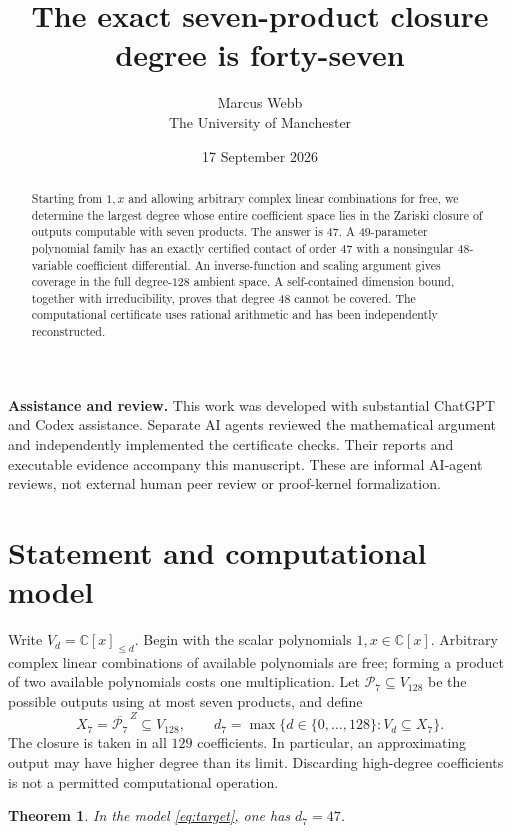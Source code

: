 \documentclass[11pt]{article}
\title{The exact seven-product closure degree is forty-seven}
\author{Marcus Webb\\\small The University of Manchester}
\date{17 September 2026}
\newtheorem{theorem}{Theorem}
\newcommand{\C}{\mathbb C}
\newcommand{\V}[1]{\C[x]_{\le #1}}
\begin{document}
\maketitle

\begin{abstract}
Starting from $1,x$ and allowing arbitrary complex linear combinations
for free, we determine the largest degree whose entire coefficient space
lies in the Zariski closure of outputs computable with seven products.
The answer is $47$. A $49$-parameter polynomial family has an exactly
certified contact of order $47$ with a nonsingular $48$-variable
coefficient differential. An inverse-function and scaling argument gives
coverage in the full degree-$128$ ambient space. A self-contained
dimension bound, together with irreducibility, proves that degree $48$
cannot be covered. The computational certificate uses rational arithmetic
and has been independently reconstructed.
\end{abstract}

\noindent\textbf{Assistance and review.}
This work was developed with substantial ChatGPT and Codex assistance.
Separate AI agents reviewed the mathematical argument and independently
implemented the certificate checks. Their reports and executable evidence
accompany this manuscript. These are informal AI-agent reviews, not
external human peer review or proof-kernel formalization.

\section{Statement and computational model}\label{sec:model}

Write $V_d=\V d$. Begin with the scalar polynomials $1,x\in\C[x]$.
Arbitrary complex linear combinations of available polynomials are free;
forming a product of two available polynomials costs one multiplication.
Let $\mathcal P_7\subseteq V_{128}$ be the possible outputs using at most
seven products, and define
\begin{equation}\label{eq:target}
 X_7=\overline{\mathcal P_7}^{\,Z}\subseteq V_{128},
 \qquad
 d_7=\max\{d\in\{0,\ldots,128\}:V_d\subseteq X_7\}.
\end{equation}
The closure is taken in all $129$ coefficients. In particular, an
approximating output may have higher degree than its limit. Discarding
high-degree coefficients is not a permitted computational operation.

\begin{theorem}\label{thm:main}
In the model \eqref{eq:target}, one has $d_7=47$.
\end{theorem}
\end{document}
